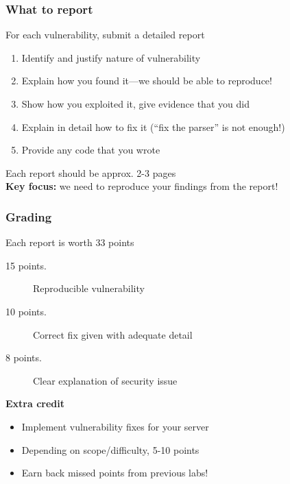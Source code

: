 \documentclass[10pt,xcolor={dvipsnames}]{beamer}
\begin{document}
\begin{frame}

\frametitle{What to report}

For each vulnerability, submit a detailed report
\begin{enumerate}
\pause\item Identify and justify nature of vulnerability
\pause\item Explain how you found it---we should be able to reproduce!
\pause\item Show how you exploited it, give evidence that you did
\pause\item Explain in detail how to fix it (``fix the parser'' is not enough!) 
\pause\item Provide any code that you wrote
\\[1em]
\end{enumerate}

\pause
Each report should be approx. 2-3 pages
\\[1em]

\pause
\textbf{Key focus:} we need to reproduce your findings from the report!

\end{frame}


\begin{frame}

\frametitle{Grading}

Each report is worth 33 points
\begin{description}
\item[15 points.] Reproducible vulnerability
\item[10 points.] Correct fix given with adequate detail
\item[8 points.] Clear explanation of security issue\\[2em]
\end{description}

\pause
\textbf{Extra credit}
\begin{itemize}
\item Implement vulnerability fixes for your server
\item Depending on scope/difficulty, 5-10 points
\item Earn back missed points from previous labs!
\end{itemize}

\end{frame}

\end{document}
